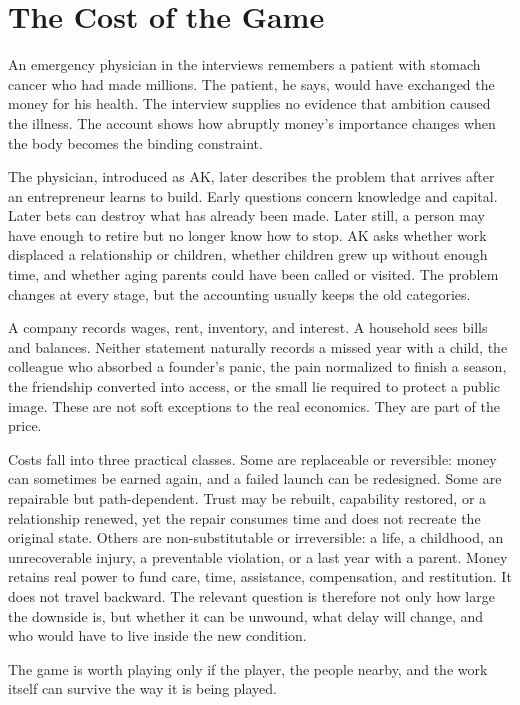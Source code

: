 \chapter{The Cost of the Game}

An emergency physician in the interviews remembers a patient with stomach
cancer who had made millions. The patient, he says, would have exchanged the
money for his health. The interview supplies no evidence that ambition caused
the illness. The account shows how abruptly money's importance changes when
the body becomes the binding constraint.

The physician, introduced as AK, later describes the problem that arrives
after an entrepreneur learns to build. Early questions concern knowledge and
capital. Later bets can destroy what has already been made. Later still, a
person may have enough to retire but no longer know how to stop. AK asks
whether work displaced a relationship or children, whether children grew up
without enough time, and whether aging parents could have been called or
visited. The problem changes at every stage, but the accounting usually keeps
the old categories.

A company records wages, rent, inventory, and interest. A household sees bills
and balances. Neither statement naturally records a missed year with a child,
the colleague who absorbed a founder's panic, the pain normalized to finish a
season, the friendship converted into access, or the small lie required to
protect a public image. These are not soft exceptions to the real economics.
They are part of the price.

Costs fall into three practical classes. Some are replaceable or reversible:
money can sometimes be earned again, and a failed launch can be redesigned.
Some are repairable but path-dependent. Trust may be rebuilt, capability
restored, or a relationship renewed, yet the repair consumes time and does not
recreate the original state. Others are non-substitutable or irreversible: a
life, a childhood, an unrecoverable injury, a preventable violation, or a last
year with a parent. Money retains real power to fund care, time, assistance,
compensation, and restitution. It does not travel backward. The relevant
question is therefore not only how large the downside is, but whether it can be
unwound, what delay will change, and who would have to live inside the new
condition.

The game is worth playing only if the player, the people nearby, and the work
itself can survive the way it is being played.

